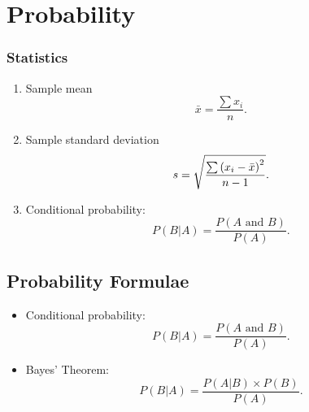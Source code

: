 
\chapter{Probability}
\subsection{Statistics}

\begin{enumerate}
	\item Sample mean
	\begin{equation*}
		\bar{x}=\frac{\sum x_{i}}{n}.
	\end{equation*}
	
	\item Sample standard deviation
	\begin{equation*}
		s=\sqrt{\frac{\sum \left( x_{i}-\bar{x}\right) ^{2}}{%
				n-1}}.
	\end{equation*}
	
	\item Conditional probability:
	\begin{equation*}
		P(B|A)=\frac{P\left( A\text{ and }B\right) }{P\left( A\right) }.
	\end{equation*}
	
	
	
	
	
	
\end{enumerate}

\section{Probability Formulae}

\begin{itemize}
	
	\item Conditional probability:
	\begin{equation*}
		P(B|A)=\frac{P\left( A\text{ and }B\right) }{P\left( A\right) }.
	\end{equation*}
	
	
	\item Bayes' Theorem:
	\begin{equation*}
		P(B|A)=\frac{P\left(A|B\right) \times P(B) }{P\left( A\right) }.
	\end{equation*}
\end{itemize}
